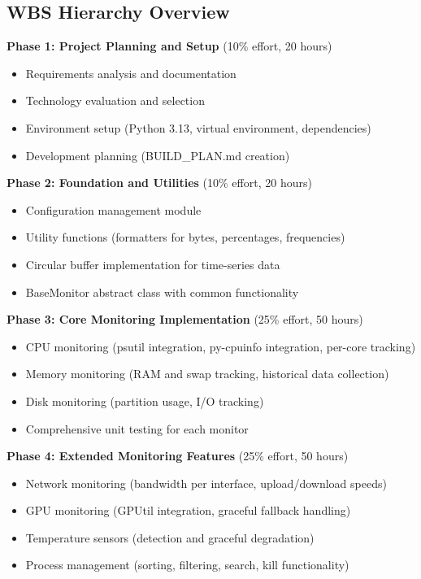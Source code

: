 \documentclass[12pt,a4paper,oneside]{report}
\begin{document}
\subsection{WBS Hierarchy Overview}

\textbf{Phase 1: Project Planning and Setup} (10\% effort, 20 hours)
\begin{itemize}
    \item Requirements analysis and documentation
    \item Technology evaluation and selection
    \item Environment setup (Python 3.13, virtual environment, dependencies)
    \item Development planning (BUILD\_PLAN.md creation)
\end{itemize}

\textbf{Phase 2: Foundation and Utilities} (10\% effort, 20 hours)
\begin{itemize}
    \item Configuration management module
    \item Utility functions (formatters for bytes, percentages, frequencies)
    \item Circular buffer implementation for time-series data
    \item BaseMonitor abstract class with common functionality
\end{itemize}

\textbf{Phase 3: Core Monitoring Implementation} (25\% effort, 50 hours)
\begin{itemize}
    \item CPU monitoring (psutil integration, py-cpuinfo integration, per-core tracking)
    \item Memory monitoring (RAM and swap tracking, historical data collection)
    \item Disk monitoring (partition usage, I/O tracking)
    \item Comprehensive unit testing for each monitor
\end{itemize}

\textbf{Phase 4: Extended Monitoring Features} (25\% effort, 50 hours)
\begin{itemize}
    \item Network monitoring (bandwidth per interface, upload/download speeds)
    \item GPU monitoring (GPUtil integration, graceful fallback handling)
    \item Temperature sensors (detection and graceful degradation)
    \item Process management (sorting, filtering, search, kill functionality)
\end{itemize}
\end{document}
